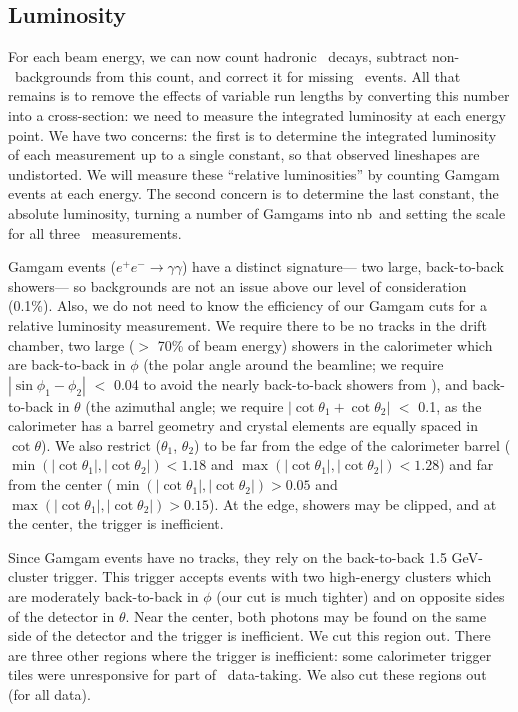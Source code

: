 \documentclass[aps,prd,preprint,superscriptaddress,tightenlines,nofootinbib,floatfix]{revtex4}
\begin{document}
%
\subsection{Luminosity}
%

For each beam energy, we can now count hadronic \ups\ decays, subtract
non-\ups\ backgrounds from this count, and correct it for missing
\ups\ events.  All that remains is to remove the effects of variable
run lengths by converting this number into a cross-section: we need to
measure the integrated luminosity at each energy point.  We have two
concerns: the first is to determine the integrated luminosity of each
measurement up to a single constant, so that observed lineshapes are
undistorted.  We will measure these ``relative luminosities'' by
counting Gamgam events at each energy.  The second concern is to
determine the last constant, the absolute luminosity, turning a number
of Gamgams into nb\inv\ and setting the scale for all three \gee\
measurements.

Gamgam events ($e^+e^- \to \gamma\gamma$) have a distinct signature---
two large, back-to-back showers--- so backgrounds are not an issue
above our level of consideration (0.1\%).  Also, we do not need to
know the efficiency of our Gamgam cuts for a relative luminosity
measurement.  We require there to be no tracks in the drift chamber,
two large ($>$ 70\% of beam energy) showers in the calorimeter which
are back-to-back in $\phi$ (the polar angle around the beamline; we
require $|\sin \phi_1 - \phi_2|$ $<$ 0.04 to avoid the nearly
back-to-back showers from \ee), and back-to-back in $\theta$ (the
azimuthal angle; we require $|\cot\theta_1 + \cot\theta_2|$ $<$ 0.1,
as the calorimeter has a barrel geometry and crystal elements are
equally spaced in $\cot\theta$).  We also restrict ($\theta_1$,
$\theta_2$) to be far from the edge of the calorimeter barrel
($\min(|\cot\theta_1|, |\cot\theta_2|) < 1.18$ and
$\max(|\cot\theta_1|, |\cot\theta_2|) < 1.28$) and far from the center
($\min(|\cot\theta_1|, |\cot\theta_2|) > 0.05$ and
$\max(|\cot\theta_1|, |\cot\theta_2|) > 0.15$).  At the edge, showers
may be clipped, and at the center, the trigger is inefficient.

Since Gamgam events have no tracks, they rely on the back-to-back 1.5
GeV-cluster trigger.  This trigger accepts events with two high-energy
clusters which are moderately back-to-back in $\phi$ (our cut is much
tighter) and on opposite sides of the detector in $\theta$.  Near the
center, both photons may be found on the same side of the detector and
the trigger is inefficient.  We cut this region out.  There are three
other regions where the trigger is inefficient: some calorimeter
trigger tiles were unresponsive for part of \ups\ data-taking.  We
also cut these regions out (for all data).
\end{document}
